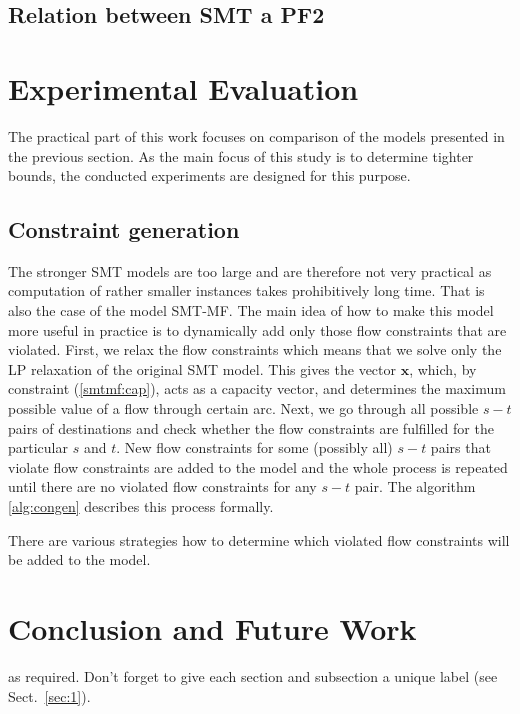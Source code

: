 \subsection{Relation between SMT a PF2}
\section{Experimental Evaluation}
\label{sec:exp}
The practical part of this work focuses on comparison of the models presented in the previous section. As the main focus of this study is to determine tighter bounds, the conducted experiments are designed for this purpose. 

\subsection{Constraint generation}
The stronger SMT models are too large and are therefore not very practical as computation of rather smaller instances takes prohibitively long time. That is also the case of the model SMT-MF. The main idea of how to make this model more useful in practice is to dynamically add only those flow constraints that are violated. First, we relax the flow constraints which means that we solve only the LP relaxation of the original SMT model. This gives the vector $\mathbf{x}$, which, by constraint (\ref{smtmf:cap}), acts as a capacity vector, and determines the maximum possible value of a flow through certain arc. Next, we go through all possible $s-t$ pairs of destinations and check whether the flow constraints are fulfilled for the particular $s$ and $t$. New flow constraints for some (possibly all) $s-t$ pairs that violate flow constraints are added to the model and the whole process is repeated until there are no violated flow constraints for any $s-t$ pair. The algorithm \ref{alg:congen} describes this process formally.


There are various strategies how to determine which violated flow constraints will be added to the model. 

\section{Conclusion and Future Work}
\label{sec:conclusion}
as required. Don't forget to give each section
and subsection a unique label (see Sect.~\ref{sec:1}).

